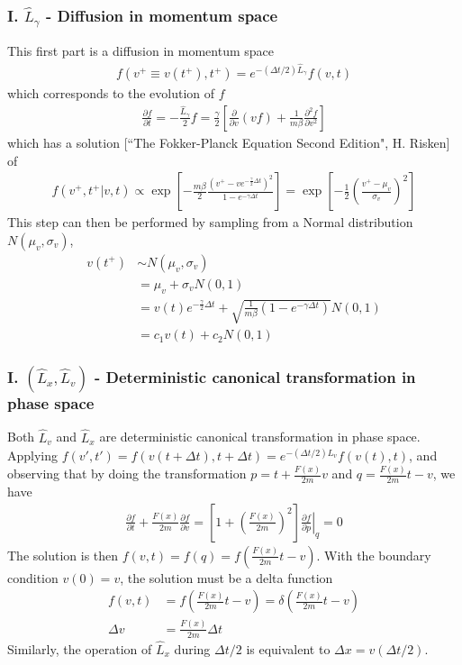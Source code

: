 \documentclass[10pt]{article}
\begin{document}
\subsubsection*{I. $\hat{L}_{\gamma}$ - Diffusion in momentum space}
This first part is a diffusion in momentum space
\begin{align*}
f(v^{+}\equiv v(t^{+}), t^{+})=e^{-(\Delta t/2)\hat{L}_{\gamma}}f(v,t)
\end{align*}
which corresponds to the evolution of $f$
\begin{align*}
\frac{\partial f}{\partial t}=-\frac{\hat{L}_{\gamma}}{2}f=\frac{\gamma}{2}\left[\frac{\partial }{\partial v}(vf)+\frac{1}{m\beta}\frac{\partial^2 f}{\partial v^2}\right]
\end{align*}
which has a solution [``The Fokker-Planck Equation Second Edition", H. Risken] of
\begin{align*}
f(v^{+}, t^{+}|v,t)\propto\exp\left[-\frac{m\beta}{2} \frac{\left(v^{+}-v e^{-\frac{\gamma}{2}\Delta t}\right)^2}{1-e^{-\gamma\Delta t}} \right]=\exp\left[ -\frac{1}{2}\left(\frac{v^{+}-\mu_v}{\sigma_v}\right)^2 \right]
\end{align*}
This step can then be performed by sampling from a Normal distribution $N(\mu_v, \sigma_v)$,
\begin{align*}
v(t^{+})&\sim N(\mu_v, \sigma_v) \\
&=\mu_v+\sigma_v N(0,1) \\
&=v(t)e^{-\frac{\gamma}{2}\Delta t}+\sqrt{ \frac{1}{m\beta}\left(1-e^{-\gamma\Delta t}\right) } N(0,1) \\
&=c_1 v(t)+c_2 N(0,1)
\end{align*}
\subsubsection*{I. $(\hat{L}_x, \hat{L}_v)$ - Deterministic canonical transformation in phase space}
Both $\hat{L}_v$ and $\hat{L}_x$ are deterministic canonical transformation in phase space.  Applying $f(v',t')=f(v(t+\Delta t), t+\Delta t)=e^{-(\Delta t/2)\hat{L}_v}f(v(t),t)$, and observing that by doing the transformation $p=t+\frac{F(x)}{2m}v$ and $q=\frac{F(x)}{2m}t-v$, we have
\begin{align*}
\frac{\partial f}{\partial t}+\frac{F(x)}{2m}\frac{\partial f}{\partial v}=\left[1+\left(\frac{F(x)}{2m}\right)^2\right] \left.\frac{\partial f}{\partial p}\right|_q=0
\end{align*}
The solution is then $f(v,t)=f(q)=f(\frac{F(x)}{2m}t-v)$. With the boundary condition $v(0)=v$, the solution must be a delta function
\begin{align*}
f(v,t)&=f(\frac{F(x)}{2m}t-v)=\delta(\frac{F(x)}{2m}t-v) \\
\Delta v&=\frac{F(x)}{2m}\Delta t
\end{align*}
Similarly, the operation of $\hat{L}_x$ during $\Delta t/2$ is equivalent to $\Delta x=v(\Delta t/2)$.
\end{document}
